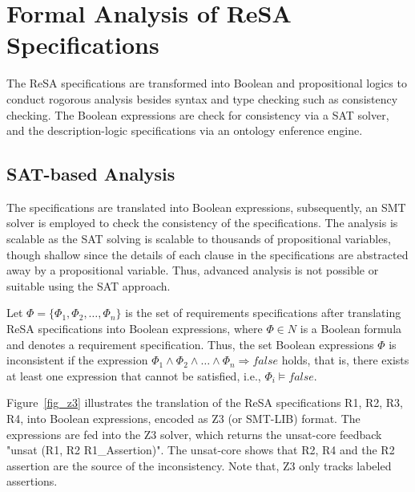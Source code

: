 \section{Formal Analysis of ReSA Specifications}
The ReSA specifications are transformed into Boolean and propositional logics to conduct rogorous analysis besides syntax and type checking such as consistency checking. The Boolean expressions are check for consistency via a SAT solver, and the description-logic specifications via an ontology enference engine. 

\subsection{SAT-based Analysis}
The specifications are translated into Boolean expressions, subsequently, an SMT solver is employed to check the consistency of the specifications. The analysis is scalable as the SAT solving is scalable to thousands of propositional variables, though shallow since the details of each clause in the specifications are abstracted away by a propositional variable. Thus, advanced analysis is not possible or suitable using the SAT approach.%
\begin{definition}
	Let $\Phi = \{\Phi_1, \Phi_2,\dots,\Phi_n\}$ is the set of requirements specifications after translating ReSA specifications into Boolean expressions, where  $\Phi\in N$ is a Boolean formula and denotes a requirement specification. Thus, the set Boolean expressions $\Phi$ is inconsistent if the expression $\Phi_1 \land \Phi_2 \land\dots\land \Phi_n \Rightarrow false$ holds, that is, there exists at least one expression that cannot be satisfied, i.e., $\Phi_i\models false$.
\end{definition}
\begin{example}
Figure~\ref{fig_z3} illustrates the translation of the ReSA specifications R1, R2, R3, R4, into Boolean expressions, encoded as Z3 (or SMT-LIB) format. %
The expressions are fed into the Z3 solver, which returns the unsat-core feedback "unsat (R1, R2 R1\_Assertion)". The unsat-core shows that R2, R4 and the R2 assertion are the source of the inconsistency. Note that, Z3 only tracks labeled assertions.
\end{example}
